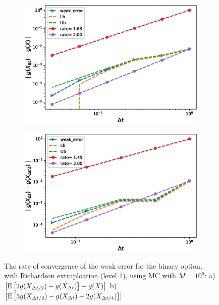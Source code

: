 \documentclass[11pt]{article}
\newcommand{\expt}[1]{\mathrm{E}\left[#1\right]}
\begin{document}
\begin{figure}[h!]
	\centering
	\begin{subfigure}{.4\textwidth}
		\centering
		\includegraphics[width=1\linewidth]{./figures/binary_weak_error/with_richardson/weak_convergence_order_binary_richardson_relative_M_5_10_6}
		\caption{}
		\label{fig:sub3}
	\end{subfigure}%
	\begin{subfigure}{.4\textwidth}
		\centering
		\includegraphics[width=1\linewidth]{./figures/binary_weak_error/with_richardson/weak_convergence_order_differences_binary_richardson_relative_M_5_10_6}
		\caption{}
		\label{fig:sub4}
	\end{subfigure}
	
	\caption{The rate of convergence of the weak error for the binary option, with Richardson extraploation (level 1), using MC with $M=10^6$: a) $\abs{\expt{2 g(X_{\Delta t/2}) -g(X_{\Delta t})}-g(X)}$  b) $\abs{\expt{3 g(X_{\Delta t/2})-g(X_{\Delta t})-2 g(X_{\Delta t/4})}}$ }
	\label{fig:fig:Weak_rate_binary_with_rich}
\end{figure}
\end{document}
